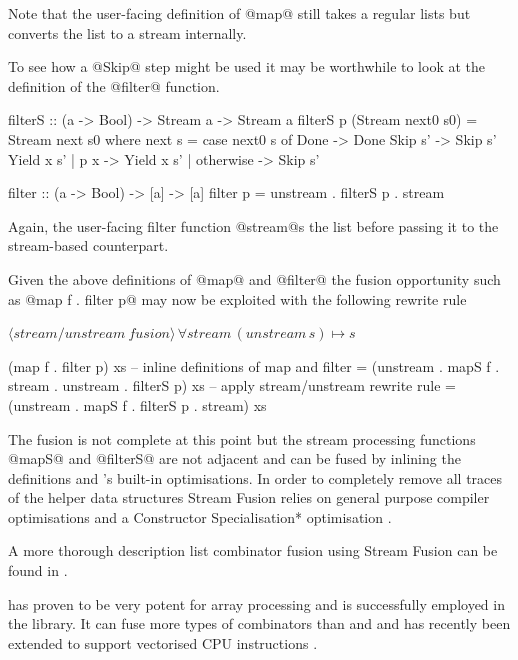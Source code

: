 \documentclass[preamble.tex]{subfiles}
\begin{document}
Note that the user-facing definition of @map@ still takes a regular lists but converts the list to a stream internally.

To see how a @Skip@ step might be used it may be worthwhile to look at the definition of the @filter@ function.

\begin{hscode}
filterS :: (a -> Bool) -> Stream a -> Stream a
filterS p (Stream next0 s0) = Stream next s0
  where next s = case next0 s of
    Done                   -> Done
    Skip    s'             -> Skip    s'
    Yield x s' | p x       -> Yield x s'
               | otherwise -> Skip    s'

filter :: (a -> Bool) -> [a] -> [a]
filter p = unstream . filterS p . stream
\end{hscode}

Again, the user-facing filter function @stream@s the list before passing it to the stream-based counterpart.

Given the above definitions of @map@ and @filter@ the fusion opportunity such as @map f . filter p@ may now be exploited with the following rewrite rule

$\langle \mathit{stream/unstream\ fusion}\rangle\,\forall stream\, (unstream\, s)\mapsto s$

\begin{hscode}
(map f . filter p) xs
  -- inline definitions of map and filter
  = (unstream . mapS f . stream . unstream . filterS p) xs
  -- apply stream/unstream rewrite rule
  = (unstream . mapS f . filterS p . stream) xs
\end{hscode}

The fusion is not complete at this point but the stream processing functions @mapS@ and @filterS@ are not adjacent and can be fused by inlining the definitions and \GHC's built-in optimisations. In order to completely remove all traces of the helper data structures Stream Fusion relies on general purpose compiler optimisations and a \*Constructor Specialisation* optimisation \cite{SpecConstr}.

A more thorough description list combinator fusion using Stream Fusion can be found in \cite{CLS07}.

 has proven to be very potent for array processing and is successfully employed in the  library. It can fuse more types of combinators than  and  and has recently been extended to support vectorised CPU instructions \cite{VectorStreamFusion}.
\end{document}
